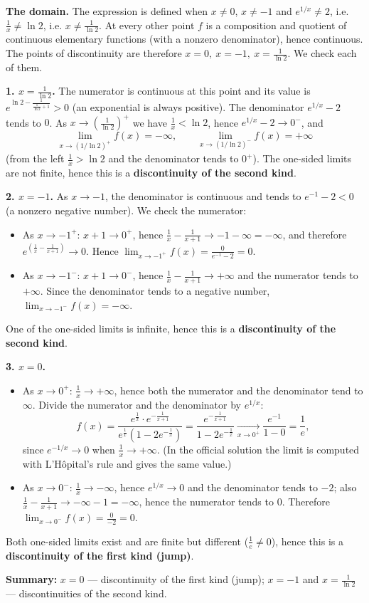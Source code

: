 \begin{solution}
\textbf{The domain.} The expression is defined when $x\neq0$, $x\neq-1$ and $e^{1/x}\neq 2$, i.e. $\frac1x\neq\ln2$, i.e. $x\neq\frac1{\ln2}$. At every other point $f$ is a composition and quotient of continuous elementary functions (with a nonzero denominator), hence continuous. The points of discontinuity are therefore $x=0,\ x=-1,\ x=\frac{1}{\ln2}$. We check each of them.

\textbf{1. $x=\frac1{\ln2}$.} The numerator is continuous at this point and its value is
$e^{\ln2-\frac{1}{\frac1{\ln2}+1}}>0$ (an exponential is always positive). The denominator $e^{1/x}-2$ tends to $0$. As $x\to\left(\frac1{\ln2}\right)^+$ we have $\frac1x<\ln2$, hence $e^{1/x}-2\to0^-$, and
\[ \lim_{x\to(1/\ln2)^+}f(x)=-\infty, \qquad \lim_{x\to(1/\ln2)^-}f(x)=+\infty \]
(from the left $\frac1x>\ln2$ and the denominator tends to $0^+$). The one-sided limits are not finite, hence this is a \textbf{discontinuity of the second kind}.

\textbf{2. $x=-1$.} As $x\to-1$, the denominator is continuous and tends to $e^{-1}-2<0$ (a nonzero negative number). We check the numerator:
\begin{itemize}
  \item As $x\to-1^+$: $x+1\to0^+$, hence $\frac1x-\frac1{x+1}\to-1-\infty=-\infty$, and therefore $e^{\left(\frac1x-\frac1{x+1}\right)}\to0$. Hence $\lim_{x\to-1^+}f(x)=\frac{0}{e^{-1}-2}=0$.
  \item As $x\to-1^-$: $x+1\to0^-$, hence $\frac1x-\frac1{x+1}\to+\infty$ and the numerator tends to $+\infty$. Since the denominator tends to a negative number, $\lim_{x\to-1^-}f(x)=-\infty$.
\end{itemize}
One of the one-sided limits is infinite, hence this is a \textbf{discontinuity of the second kind}.

\textbf{3. $x=0$.}
\begin{itemize}
  \item As $x\to0^+$: $\frac1x\to+\infty$, hence both the numerator and the denominator tend to $\infty$. Divide the numerator and the denominator by $e^{1/x}$:
  \[ f(x)=\frac{e^{\frac1x}\cdot e^{-\frac1{x+1}}}{e^{\frac1x}\left(1-2e^{-\frac1x}\right)}=\frac{e^{-\frac{1}{x+1}}}{1-2e^{-\frac1x}}\xrightarrow[x\to0^+]{}\frac{e^{-1}}{1-0}=\frac1e, \]
  since $e^{-1/x}\to0$ when $\frac1x\to+\infty$. (In the official solution the limit is computed with L'Hôpital's rule and gives the same value.)
  \item As $x\to0^-$: $\frac1x\to-\infty$, hence $e^{1/x}\to0$ and the denominator tends to $-2$; also $\frac1x-\frac1{x+1}\to-\infty-1=-\infty$, hence the numerator tends to $0$. Therefore $\lim_{x\to0^-}f(x)=\frac{0}{-2}=0$.
\end{itemize}
Both one-sided limits exist and are finite but different ($\frac1e\neq0$), hence this is a \textbf{discontinuity of the first kind (jump)}.

\textbf{Summary:} $x=0$ — discontinuity of the first kind (jump); $x=-1$ and $x=\frac1{\ln2}$ — discontinuities of the second kind.
\end{solution}
